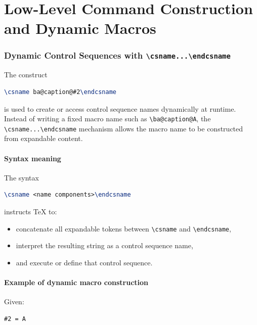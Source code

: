 \section{Low-Level Command Construction and Dynamic Macros}
\subsubsection{Dynamic Control Sequences with \texttt{\textbackslash csname...\textbackslash endcsname}}

The construct

\begin{lstlisting}[language=LaTeX]
\csname ba@caption@#2\endcsname
\end{lstlisting}

is used to create or access control sequence names dynamically at runtime. Instead of writing a fixed macro name such as \verb|\ba@caption@A|, the \verb|\csname...\endcsname| mechanism allows the macro name to be constructed from expandable content.



\paragraph{Syntax meaning}

The syntax

\begin{lstlisting}[language=LaTeX]
\csname <name components>\endcsname
\end{lstlisting}

instructs TeX to:

\begin{itemize}
\item concatenate all expandable tokens between \verb|\csname| and \verb|\endcsname|,
\item interpret the resulting string as a control sequence name,
\item and execute or define that control sequence.
\end{itemize}



\paragraph{Example of dynamic macro construction}

Given:

\begin{lstlisting}[language=LaTeX]
#2 = A
\end{lstlisting}

